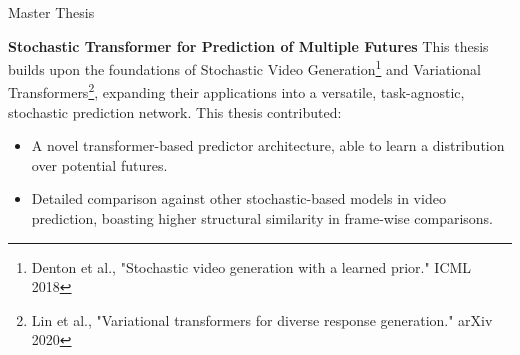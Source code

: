 \begin{rubric}{Master Thesis}

\iffalse
\entry*[2023]%
\textbf{Stochastic Transformer for Prediction of Multiple Futures}  \newline 
This thesis extended the work of Stochastic Video Generation\footnote{Denton et al., "Stochastic video generation with a learned prior." ICML 2018} and Variational Transformers\footnote{Lin et al., "Variational transformers for diverse response generation." arXiv 2020} into a task-agnostic, stochastic prediction network.  Our novel Stochastic Transformer (STTR) was able to learn a distribution over possible futures in video prediction.  Sampling from the distribution produced one potential continuation of the seed video frames.  We further applied this to the task of human pose prediction. 
\fi
\iffalse
\entry*[2023]%
\textbf{Stochastic Transformer for Prediction of Multiple Futures}  \newline 
This thesis builds upon the foundations of Stochastic Video Generation\footnote{Denton et al., "Stochastic video generation with a learned prior." ICML 2018} and Variational Transformers\footnote{Lin et al., "Variational transformers for diverse response generation." arXiv 2020}, expanding their applications into a versatile, task-agnostic, stochastic prediction network. The novel Stochastic Transformer (STTR) successfully learned a distribution over potential futures in video prediction. By sampling from this distribution, we generated diverse potential continuations of the initial video frames. We also applied this approach to the task of human pose prediction.
\fi

\entry*[2023]%
\textbf{Stochastic Transformer for Prediction of Multiple Futures}  \newline 
This thesis builds upon the foundations of Stochastic Video Generation\footnote{Denton et al., "Stochastic video generation with a learned prior." ICML 2018} and Variational Transformers\footnote{Lin et al., "Variational transformers for diverse response generation." arXiv 2020}, expanding their applications into a versatile, task-agnostic, stochastic prediction network.  This thesis contributed: \newline
\vspace{\CVItemizeHeaderSpacing} \begin{itemize} %
	\setlength{\itemsep}{\CVItemizeSpacing}
	\item A novel transformer-based predictor architecture, able to learn a distribution over potential futures.%
	\item Detailed comparison against other stochastic-based models in video prediction, boasting higher structural similarity in frame-wise comparisons.
\end{itemize}





\end{rubric}
